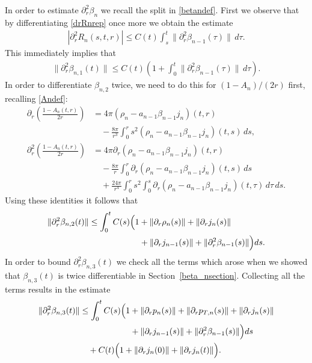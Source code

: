 \documentclass[11pt]{article}
\begin{document}
In order to estimate $\partial_r^2 \beta_n$
we recall the split in \eqref{betandef}.
First we observe that by differentiating \eqref{drRnrep} once more we obtain the
estimate
\begin{align}\label{drrR_n}
  \left|\partial_r^2 R_n (s,t,r)\right|
  \leq C(t) \int_s^t \|\partial_r^2\beta_{n-1}(\tau)\|\, d\tau .
\end{align}
This immediately implies that
\begin{align}\label{drrbeta_n1}
  \|\partial_r^2 \beta_{n,1}(t)\|
  \leq C(t) \left(1+\int_0^t \|\partial_r^2\beta_{n-1}(\tau)\|\, d\tau\right).
\end{align}
In order to differentiate $\beta_{n,2}$ twice, we need to do this for
$(1-A_n)/(2r)$ first, recalling \eqref{Andef}:
\begin{align*}
  \partial_r\left(\frac{1-A_n(t,r)}{2r}\right)
  &=4\pi(\rho_n - a_{n-1} \beta_{n-1} j_n)(t,r)\\
  &\quad {} -
  \frac{8\pi}{r^3}\int_0^r s^2(\rho_n - a_{n-1} \beta_{n-1} j_n)(t,s)\,ds,
  \\
  \partial_r^2\left(\frac{1-A_n(t,r)}{2r}\right)
  &=4\pi \partial_r (\rho_n - a_{n-1} \beta_{n-1} j_n)(t,r)\\
  &\quad {} - \frac{8\pi}{r}
  \int_0^r \partial_r(\rho_n - a_{n-1} \beta_{n-1} j_n)(t,s)\,ds\\
  &\quad {} + \frac{24\pi}{r^4}\int_0^r s^2
  \int_0^s\partial_r(\rho_n - a_{n-1} \beta_{n-1} j_n)(t,\tau)\,d\tau\,ds.
\end{align*}
Using these identities it follows that
\begin{align}\label{drrbeta_n2}
 \|\partial_r^2 \beta_{n,2}(t)\|
 &\leq
 \int_0^t C(s)\Bigl( 1 + \|\partial_r \rho_n(s)\|
 + \|\partial_r j_n(s)\|  \notag \\
 &\qquad \qquad\qquad {} + \|\partial_r j_{n-1}(s)\|
 + \|\partial_r^2 \beta_{n-1}(s)\|\Bigr) ds.
\end{align}
In order to bound $\partial_r^2 \beta_{n,3}(t)$
we check all the terms which arose
when we showed that $\beta_{n,3}(t)$ is twice differentiable
in Section~\ref{beta_nsection}.
Collecting all the terms results in the estimate
\begin{align}\label{drrbeta_n3}
 \|\partial_r^2 \beta_{n,3}(t)\|
 &\leq
 \int_0^t C(s)\Bigl( 1 + \|\partial_r p_n(s)\| + \|\partial_r p_{T,n}(s)\|
 + \|\partial_r j_n(s)\|  \notag \\
 &\qquad \qquad\qquad {} + \|\partial_r j_{n-1}(s)\|
 + \|\partial_r^2 \beta_{n-1}(s)\|\Bigr) ds\\
 &\quad {}+ C(t)\Bigl( 1 + \|\partial_r j_n(0)\| + \|\partial_r j_n(t)\|\Bigr).
\end{align}
\end{document}
